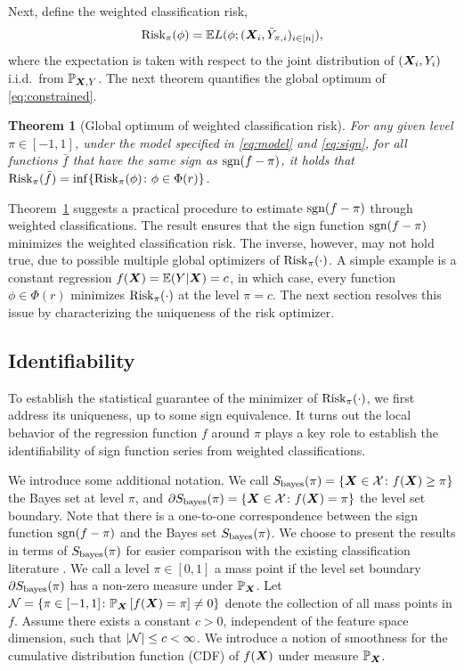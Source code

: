 \documentclass[11pt]{article}
\theoremstyle{plain}
\newtheorem{thm}{Theorem}[section]
\theoremstyle{definition}
\def\sign{\textup{sgn}}
\def\bayesS{S_{\textup{bayes}}}
\def\risk{\textup{Risk}_\pi}
\begin{document}
Next, define the weighted classification risk, 
\begin{equation}\label{eq:constrained}
\risk(\phi)=\mathbb{E}L(\phi; (\mX_i,\bar Y_{\pi,i})_{i\in[n]}),
\end{equation}
where the expectation is taken with respect to the joint distribution of $(\bm X_i,Y_i)$ i.i.d.\ from $\mathbb{P}_{\bm X,Y}$. The next theorem quantifies the global optimum of \eqref{eq:constrained}. 

\begin{thm}[Global optimum of weighted classification risk]\label{thm:oracle} For any given level $\pi\in[-1,1]$, under the model specified in \eqref{eq:model} and \eqref{eq:sign}, for all functions $\bar f$ that have the same sign as $\sign(f-\pi)$, it holds that $\risk(\bar f) = \inf\{\risk(\phi)\colon \phi\in \Phi(r)\}$. 
\end{thm}

\noindent
Theorem~\ref{thm:oracle} suggests a practical procedure to estimate $\sign(f-\pi)$ through weighted classifications. The result ensures that the sign function $\sign(f-\pi)$ minimizes the weighted classification risk. The inverse, however, may not hold true, due to possible multiple global optimizers of $\risk(\cdot)$. A simple example is a constant regression $f(\bm X)=\mathbb{E}(Y|\bm X) = c$, in which case, every function $\phi\in \Phi(r)$ minimizes $\risk(\cdot)$ at the level $\pi=c$. The next section resolves this issue by characterizing the uniqueness of the risk optimizer. 



\subsection{Identifiability}\label{sec:identifiability}

To establish the statistical guarantee of the minimizer of $\risk(\cdot)$, we first address its uniqueness, up to some sign equivalence. It turns out the local behavior of the regression function $f$ around $\pi$ plays a key role to establish the identifiability of sign function series from weighted classifications.

We introduce some additional notation. We call $\bayesS(\pi)=\{\mX\in\tX\colon f(\mX)\geq \pi\}$ the Bayes set at level $\pi$, and $\partial \bayesS(\pi)=\{\mX\in \tX\colon f(\mX)=\pi\}$ the level set boundary. Note that there is a one-to-one correspondence between the sign function $\sign(f-\pi)$ and the Bayes set $\bayesS(\pi)$. We choose to present the results in terms of $\bayesS(\pi)$ for easier comparison with the existing classification literature \citep{tsybakov2004optimal,singh2009adaptive}. We call a level $\pi\in[0,1]$ a mass point if the level set boundary $\partial \bayesS(\pi)$ has a non-zero measure under $\mathbb{P}_{\bm X}$. Let $\mathcal{N}=\{\pi\in[-1,1] \colon \mathbb{P}_{\bm X}\left[f(\bm X)=\pi\right]\neq 0\}$ denote the collection of all mass points in $f$. Assume there exists a constant $c>0$, independent of the feature space dimension, such that $|\mathcal{N}|\leq c<\infty$. We introduce a notion of smoothness for the cumulative distribution function (CDF) of $f(\bm X)$ under measure $ \mathbb{P}_{\bm X}$. 
\end{document}
